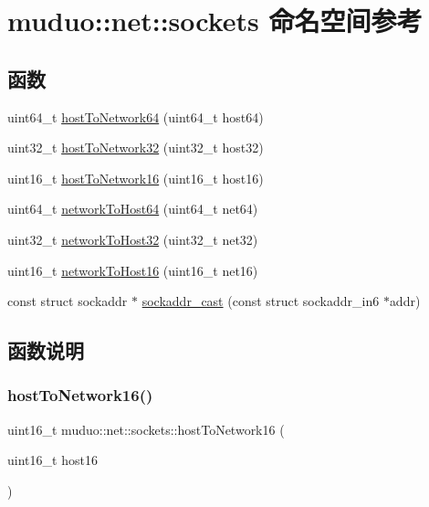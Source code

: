 \hypertarget{namespacemuduo_1_1net_1_1sockets}{}\section{muduo\+:\+:net\+:\+:sockets 命名空间参考}
\label{namespacemuduo_1_1net_1_1sockets}
\subsection*{函数}
\begin{DoxyCompactItemize}
\item 
uint64\+\_\+t \hyperlink{namespacemuduo_1_1net_1_1sockets_ad0a6476a5e70fb475acf4e34f5a5f8cc}{host\+To\+Network64} (uint64\+\_\+t host64)
\item 
uint32\+\_\+t \hyperlink{namespacemuduo_1_1net_1_1sockets_a4bb4a759c0f63477b89bac777f863cef}{host\+To\+Network32} (uint32\+\_\+t host32)
\item 
uint16\+\_\+t \hyperlink{namespacemuduo_1_1net_1_1sockets_ae117e4d96b27b387f167e75fb17c1834}{host\+To\+Network16} (uint16\+\_\+t host16)
\item 
uint64\+\_\+t \hyperlink{namespacemuduo_1_1net_1_1sockets_a590d67f0a8d4f8ff19462c08ebfb99b0}{network\+To\+Host64} (uint64\+\_\+t net64)
\item 
uint32\+\_\+t \hyperlink{namespacemuduo_1_1net_1_1sockets_a23f7d77e0379e52b1390e1d2846624e0}{network\+To\+Host32} (uint32\+\_\+t net32)
\item 
uint16\+\_\+t \hyperlink{namespacemuduo_1_1net_1_1sockets_a0f7768ebfa264d5c4eaf377297bab244}{network\+To\+Host16} (uint16\+\_\+t net16)
\item 
const struct sockaddr $\ast$ \hyperlink{namespacemuduo_1_1net_1_1sockets_ad69bf980a58ef6798c4e1dbe5497d52c}{sockaddr\+\_\+cast} (const struct sockaddr\+\_\+in6 $\ast$addr)
\end{DoxyCompactItemize}


\subsection{函数说明}
\mbox{\label{namespacemuduo_1_1net_1_1sockets_ae117e4d96b27b387f167e75fb17c1834}} 
\subsubsection{\texorpdfstring{host\+To\+Network16()}{hostToNetwork16()}}
{\footnotesize\ttfamily uint16\+\_\+t muduo\+::net\+::sockets\+::host\+To\+Network16 (\begin{DoxyParamCaption}\item[{uint16\+\_\+t}]{host16 }\end{DoxyParamCaption})\hspace{0.3cm}{\ttfamily [inline]}}



